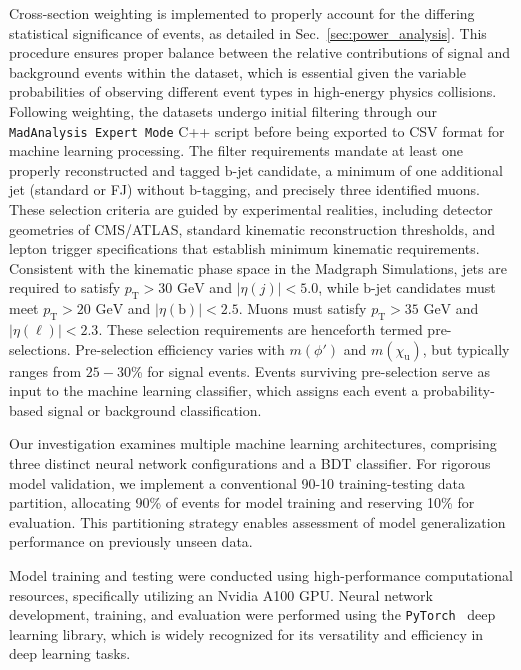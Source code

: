 Cross-section weighting is implemented to properly account for the differing statistical significance of events, as detailed in Sec.~\ref{sec:power_analysis}. This procedure ensures proper balance between the relative contributions of signal and background events within the dataset, which is essential given the variable probabilities of observing different event types in high-energy physics collisions. Following weighting, the datasets undergo initial filtering through our \texttt{MadAnalysis Expert Mode} C++ script before being exported to CSV format for machine learning processing. The filter requirements mandate at least one properly reconstructed and tagged $\mathrm{b}$-jet candidate, a minimum of one additional jet (standard or FJ) without $\mathrm{b}$-tagging, and precisely three identified muons. These selection criteria are guided by experimental realities, including detector geometries of CMS/ATLAS, standard kinematic reconstruction thresholds, and lepton trigger specifications that establish minimum kinematic requirements. Consistent with the kinematic phase space in the Madgraph Simulations, jets are required to satisfy $p_{\mathrm{T}} > 30$ $\textrm{GeV}$ and $|\eta(j)| < 5.0$, while $\mathrm{b}$-jet candidates must meet $p_{\mathrm{T}} > 20$ $\textrm{GeV}$ and $|\eta(\mathrm{b})| < 2.5$. Muons must satisfy $p_{\mathrm{T}} > 35$ $\textrm{GeV}$ and $|\eta(\ell)| < 2.3$. These selection requirements are henceforth termed pre-selections. Pre-selection efficiency varies with $m(\phi')$ and $m(\chi_{\mathrm{u}})$, but typically ranges from $25-30$\% for signal events. Events surviving pre-selection serve as input to the machine learning classifier, which assigns each event a probability-based signal or background classification. 



Our investigation examines multiple machine learning architectures, comprising three distinct neural network configurations and a BDT classifier. For rigorous model validation, we implement a conventional 90-10 training-testing data partition, allocating 90\% of events for model training and reserving 10\% for evaluation. This partitioning strategy enables assessment of model generalization performance on previously unseen data.  

Model training and testing were conducted using high-performance computational resources, specifically utilizing an Nvidia A100 GPU. Neural network development, training, and evaluation were performed using the \texttt{PyTorch}~\parencite{paszke2019} deep learning library, which is widely recognized for its versatility and efficiency in deep learning tasks.

